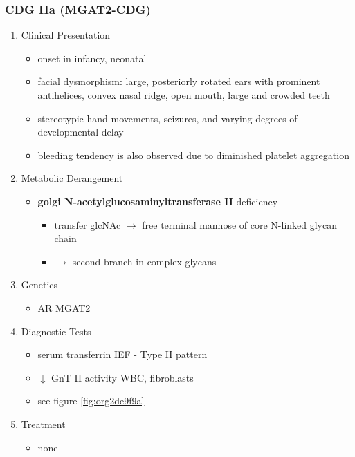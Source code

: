 \documentclass[12pt]{scrartcl}
\begin{document}
\subsubsection{CDG IIa (MGAT2-CDG)}
\label{sec:org219b50d}
\begin{enumerate}
\item Clinical Presentation
\label{sec:orgd9c628f}
\begin{itemize}
\item onset in infancy, neonatal
\item facial dysmorphism: large, posteriorly rotated ears with prominent
antihelices, convex nasal ridge, open mouth, large and crowded
teeth
\item stereotypic hand movements, seizures, and varying degrees of
developmental delay
\item bleeding tendency is also observed due to diminished platelet
aggregation
\end{itemize}

\item Metabolic Derangement
\label{sec:org1532bb3}
\begin{itemize}
\item \textbf{golgi N-acetylglucosaminyltransferase II} deficiency
\begin{itemize}
\item transfer glcNAc \(\to\) free terminal mannose of core N-linked glycan chain
\item \(\to\) second branch in complex glycans
\end{itemize}
\end{itemize}
\item Genetics
\label{sec:org8b6d552}
\begin{itemize}
\item AR MGAT2
\end{itemize}
\item Diagnostic Tests
\label{sec:org36fd8c0}
\begin{itemize}
\item serum transferrin IEF - Type II pattern
\item \(\downarrow\) GnT II activity WBC, fibroblasts
\item see figure \ref{fig:org2de9f9a}
\end{itemize}
\item Treatment
\label{sec:orgc219165}
\begin{itemize}
\item none
\end{itemize}
\end{enumerate}
\end{document}
